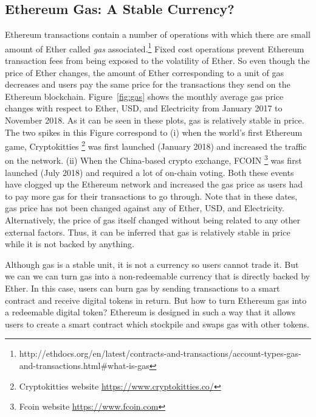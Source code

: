 
\subsection{Ethereum Gas: A Stable Currency?}\label{sec:GasInvs}

Ethereum transactions contain a number of operations with which there are small amount of Ether called \textit{gas} associated.\footnote{http://ethdocs.org/en/latest/contracts-and-transactions/account-types-gas-and-transactions.html\#what-is-gas} Fixed cost operations prevent Ethereum transaction fees from being exposed to the volatility of Ether. So even though the price of Ether changes, the amount of Ether corresponding to a unit of gas decreases and users pay the same price for the transactions they send on the Ethereum blockchain.
Figure~\ref{fig:gas} shows the monthly average gas price changes with respect to Ether, USD, and Electricity from January 2017 to November 2018. As it can be seen in these plots, gas is relatively stable in price. The two spikes in this Figure correspond to (i) when the world's first Ethereum game, Cryptokitties \footnote{Cryptokitties website \url{https://www.cryptokitties.co/}} was first launched (January 2018) and increased the traffic on the network. (ii) When the China-based crypto exchange, FCOIN \footnote{Fcoin website \url{https://www.fcoin.com}} was first launched (July 2018) and required a lot of on-chain voting. Both these events have clogged up the Ethereum network and increased the gas price as users had to pay more gas for their transactions to go through.
Note that in these dates, gas price has not been changed against any of Ether, USD, and Electricity. Alternatively, the price of gas itself changed without being related to any other external factors. Thus, it can be inferred that gas is relatively stable in price while it is not backed by anything. \par
Although gas is a stable unit, it is not a currency so users cannot trade it. But we can we can turn gas  into a non-redeemable currency that is directly backed by Ether. In this case, users can burn gas by sending transactions to a smart contract and receive digital tokens in return. But how to turn Ethereum gas into a redeemable digital token? Ethereum is designed in such a way that it allows users to create a smart contract which stockpile and swaps gas with other tokens. \par
